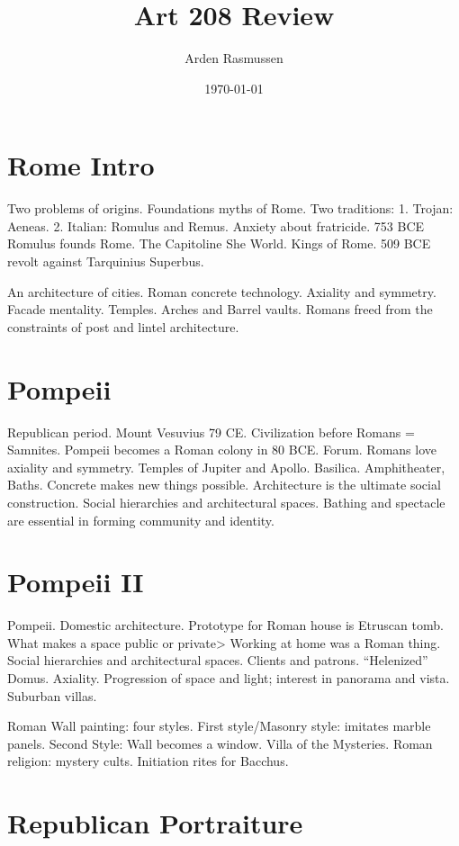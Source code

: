 \documentclass[10pt]{armath}
\title{Art 208 Review}
\author{Arden Rasmussen}
\date{\today}
\begin{document}
\maketitle

\section{Rome Intro}%
\label{sec:rome_intro}

Two problems of origins. Foundations myths of Rome. Two traditions: 1. Trojan:
Aeneas. 2. Italian: Romulus and Remus. Anxiety about fratricide. 753 BCE
Romulus founds Rome. The Capitoline She World. Kings of Rome. 509 BCE revolt
against Tarquinius Superbus.

An architecture of cities. Roman concrete technology. Axiality and symmetry.
Facade mentality. Temples. Arches and Barrel vaults. Romans freed from the
constraints of post and lintel architecture.

\section{Pompeii}%
\label{sec:pompeii}

Republican period. Mount Vesuvius 79 CE. Civilization before Romans = Samnites.
Pompeii becomes a Roman colony in 80 BCE. Forum. Romans love axiality and
symmetry. Temples of Jupiter and Apollo. Basilica. Amphitheater, Baths.
Concrete makes new things possible. Architecture is the ultimate social
construction. Social hierarchies and architectural spaces. Bathing and
spectacle are essential in forming community and identity.

\section{Pompeii II}%
\label{sec:pompeii_ii}

Pompeii. Domestic architecture. Prototype for Roman house is Etruscan tomb.
What makes a space public or private> Working at home was a Roman thing. Social
hierarchies and architectural spaces. Clients and patrons. ``Helenized''
Domus. Axiality. Progression of space and light; interest in panorama and vista.
Suburban villas.

Roman Wall painting: four styles. First style/Masonry style: imitates marble
panels. Second Style: Wall becomes a window. Villa of the Mysteries. Roman
religion: mystery cults. Initiation rites for Bacchus.

\section{Republican Portraiture}%
\label{sec:republican_portraiture}
\end{document}
